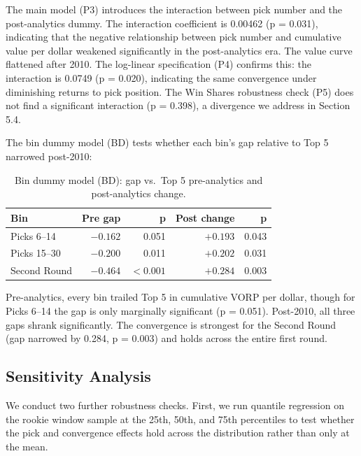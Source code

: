 \documentclass[12pt,letterpaper]{article}
\begin{document}
The main model (P3) introduces the interaction between pick number and the post-analytics dummy. The interaction coefficient is 0.00462 (p = 0.031), indicating that the negative relationship between pick number and cumulative value per dollar weakened significantly in the post-analytics era. The value curve flattened after 2010. The log-linear specification (P4) confirms this: the interaction is 0.0749 (p = 0.020), indicating the same convergence under diminishing returns to pick position. The Win Shares robustness check (P5) does not find a significant interaction (p = 0.398), a divergence we address in Section 5.4.

The bin dummy model (BD) tests whether each bin's gap relative to Top 5 narrowed post-2010:

\begin{table}[ht]
\centering
\small
\setlength{\tabcolsep}{5pt}
\begin{tabular}{@{}lrrrr@{}}
\toprule
\textbf{Bin} & \textbf{Pre gap} & \textbf{p} & \textbf{Post change} & \textbf{p} \\
\midrule
Picks 6--14  & $-0.162$ & 0.051 & $+0.193$ & 0.043 \\
Picks 15--30 & $-0.200$ & 0.011 & $+0.202$ & 0.031 \\
Second Round & $-0.464$ & $<0.001$ & $+0.284$ & 0.003 \\
\bottomrule
\end{tabular}
\caption{Bin dummy model (BD): gap vs.\ Top 5 pre-analytics and post-analytics change.}
\end{table}

Pre-analytics, every bin trailed Top 5 in cumulative VORP per dollar, though for Picks 6--14 the gap is only marginally significant (p = 0.051). Post-2010, all three gaps shrank significantly. The convergence is strongest for the Second Round (gap narrowed by 0.284, p = 0.003) and holds across the entire first round.

\subsection{Sensitivity Analysis}

We conduct two further robustness checks. First, we run quantile regression on the rookie window sample at the 25th, 50th, and 75th percentiles to test whether the pick and convergence effects hold across the distribution rather than only at the mean.
\end{document}
